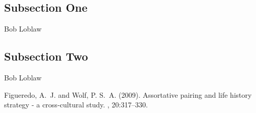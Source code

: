 \documentclass[twoside]{article}
\begin{document}
\begin{multicols}{2}
\subsection{Subsection One}

Bob Loblaw

\subsection{Subsection Two}

Bob Loblaw


\begin{thebibliography}{99} %

Figueredo, A.~J. and Wolf, P. S.~A. (2009).
\newblock Assortative pairing and life history strategy - a cross-cultural
  study.
, 20:317--330.
 
\end{thebibliography}


\end{multicols}
\end{document}
